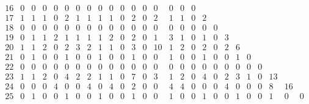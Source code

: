 \begin{landscape}
\[\begin{array}{c|ccccccccccccccccccccccccc}
16&  0&  0&  0&  0&  0&  0&  0&  0&  0&  0&  0&  0&  0&  0&  0&  0&   &   &   &   &   &   &   &   &   \\
17&  1&  1&  1&  0&  2&  1&  1&  1&  1&  0&  2&  0&  2&  1&  1&  0&  2&   &   &   &   &   &   &   &   \\
18&  0&  0&  0&  0&  0&  0&  0&  0&  0&  0&  0&  0&  0&  0&  0&  0&  0&  0&   &   &   &   &   &   &   \\
19&  0&  1&  1&  2&  1&  1&  1&  1&  2&  0&  2&  0&  1&  3&  1&  0&  1&  0&  3&   &   &   &   &   &   \\
20&  1&  1&  2&  0&  2&  3&  2&  1&  1&  0&  3&  0& 10&  1&  2&  0&  2&  0&  2&  6&   &   &   &   &   \\
21&  0&  1&  0&  0&  1&  0&  0&  1&  0&  0&  1&  0&  0&  1&  0&  0&  1&  0&  0&  1&  0&   &   &   &   \\
22&  0&  0&  0&  0&  0&  0&  0&  0&  0&  0&  0&  0&  0&  0&  0&  0&  0&  0&  0&  0&  0&  0&   &   &   \\
23&  1&  1&  2&  0&  4&  2&  2&  1&  1&  0&  7&  0&  3&  1&  2&  0&  4&  0&  2&  3&  1&  0& 13&   &   \\
24&  0&  0&  0&  4&  0&  0&  4&  0&  4&  0&  2&  0&  0&  4&  4&  0&  0&  0&  4&  0&  0&  0&  8& 16&   \\
25&  0&  1&  0&  0&  1&  0&  0&  1&  0&  0&  1&  0&  0&  1&  0&  0&  1&  0&  0&  1&  0&  0&  1&  0&  0\\
\end{array}
\]


\end{landscape}
